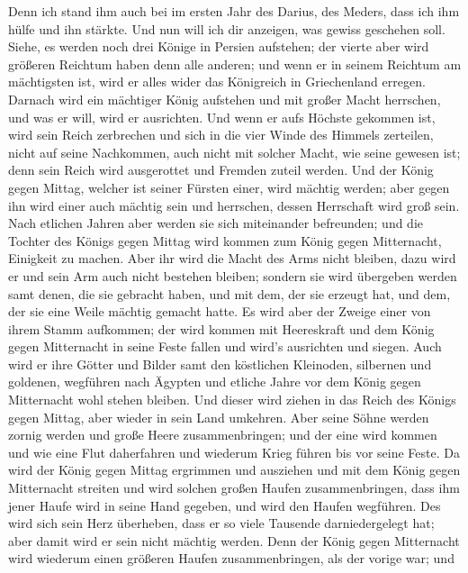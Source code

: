  Denn ich stand ihm auch bei im ersten Jahr des Darius,
des Meders, dass ich ihm hülfe und ihn stärkte.  Und nun
will ich dir anzeigen, was gewiss geschehen soll. Siehe, es werden noch
drei Könige in Persien aufstehen; der vierte aber wird größeren Reichtum
haben denn alle anderen; und wenn er in seinem Reichtum am mächtigsten
ist, wird er alles wider das Königreich in Griechenland erregen.
 Darnach wird ein mächtiger König aufstehen und mit großer
Macht herrschen, und was er will, wird er ausrichten.  Und
wenn er aufs Höchste gekommen ist, wird sein Reich zerbrechen und sich
in die vier Winde des Himmels zerteilen, nicht auf seine Nachkommen,
auch nicht mit solcher Macht, wie seine gewesen ist; denn sein Reich
wird ausgerottet und Fremden zuteil werden.  Und der König
gegen Mittag, welcher ist seiner Fürsten einer, wird mächtig werden;
aber gegen ihn wird einer auch mächtig sein und herrschen, dessen
Herrschaft wird groß sein.  Nach etlichen Jahren aber
werden sie sich miteinander befreunden; und die Tochter des Königs gegen
Mittag wird kommen zum König gegen Mitternacht, Einigkeit zu machen.
Aber ihr wird die Macht des Arms nicht bleiben, dazu wird er und sein
Arm auch nicht bestehen bleiben; sondern sie wird übergeben werden samt
denen, die sie gebracht haben, und mit dem, der sie erzeugt hat, und
dem, der sie eine Weile mächtig gemacht hatte.  Es wird
aber der Zweige einer von ihrem Stamm aufkommen; der wird kommen mit
Heereskraft und dem König gegen Mitternacht in seine Feste fallen und
wird's ausrichten und siegen.  Auch wird er ihre Götter
und Bilder samt den köstlichen Kleinoden, silbernen und goldenen,
wegführen nach Ägypten und etliche Jahre vor dem König gegen Mitternacht
wohl stehen bleiben.  Und dieser wird ziehen in das Reich
des Königs gegen Mittag, aber wieder in sein Land umkehren.
 Aber seine Söhne werden zornig werden und große Heere
zusammenbringen; und der eine wird kommen und wie eine Flut daherfahren
und wiederum Krieg führen bis vor seine Feste.  Da wird
der König gegen Mittag ergrimmen und ausziehen und mit dem König gegen
Mitternacht streiten und wird solchen großen Haufen zusammenbringen,
dass ihm jener Haufe wird in seine Hand gegeben,  und
wird den Haufen wegführen. Des wird sich sein Herz überheben, dass er so
viele Tausende darniedergelegt hat; aber damit wird er sein nicht
mächtig werden.  Denn der König gegen Mitternacht wird
wiederum einen größeren Haufen zusammenbringen, als der vorige war; und

